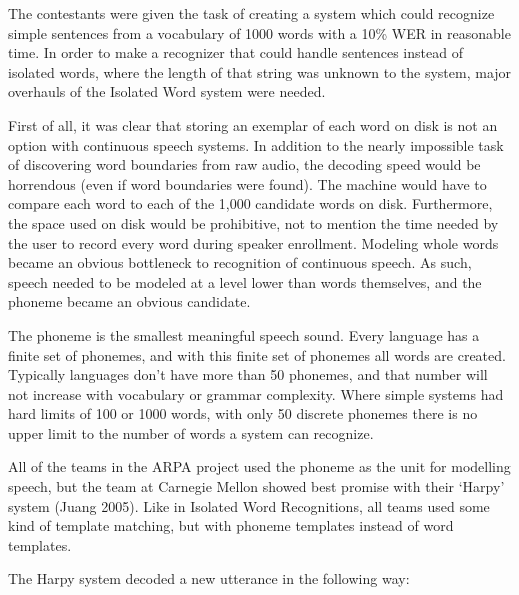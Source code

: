 \documentclass[10pt,a4paper]{article}
\begin{document}
 The contestants were given the task of creating a system which could recognize simple sentences from a vocabulary of 1000 words with a 10\% WER in reasonable time. In order to make a recognizer that could handle sentences instead of isolated words, where the length of that string was unknown to the system, major overhauls of the Isolated Word system were needed.

First of all, it was clear that storing an exemplar of each word on disk is not an option with continuous speech systems. In addition to the nearly impossible task of discovering word boundaries from raw audio, the decoding speed would be horrendous (even if word boundaries were found). The machine would have to compare each word to each of the 1,000 candidate words on disk. Furthermore, the space used on disk would be prohibitive, not to mention the time needed by the user to record every word during speaker enrollment. Modeling whole words became an obvious bottleneck to recognition of continuous speech. As such, speech needed to be modeled at a level lower than words themselves, and the phoneme became an obvious candidate.

The phoneme is the smallest meaningful speech sound. Every language has a finite set of phonemes, and with this finite set of phonemes all words are created. Typically languages don't have more than 50 phonemes, and that number will not increase with vocabulary or grammar complexity. Where simple systems had hard limits of 100 or 1000 words, with only 50 discrete phonemes there is no upper limit to the number of words a system can recognize.

All of the teams in the ARPA project used the phoneme as the unit for modelling speech, but the team at Carnegie Mellon showed best promise with their `Harpy' system (Juang 2005). Like in Isolated Word Recognitions, all teams used some kind of template matching, but with phoneme templates instead of word templates.

The Harpy system decoded a new utterance in the following way:
\end{document}
